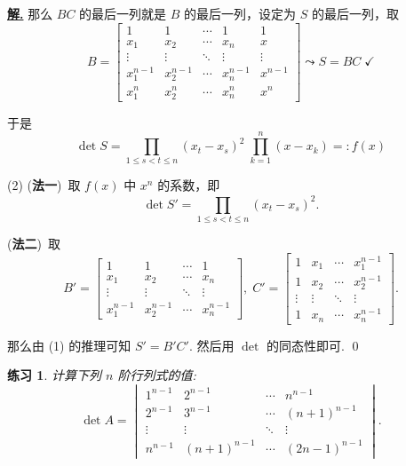 \documentclass[10pt,openany]{article}
\theoremstyle{thmstyle} %
\newtheorem{practice}{练习}[section]
\theoremstyle{defstyle} %
\theoremstyle{prostyle} %
\theoremstyle{exastyle}
\theoremstyle{remstyle}
\newenvironment{solution}{\par\underline{\textbf{解.}} \;\fangsong}{\qed\par}
\begin{document}
\begin{solution}
	那么 \( BC \) 的最后一列就是 \( B \) 的最后一列，设定为 \( S \) 的最后一列，取
	\[ B=\begin{bmatrix}
		1 & 1 & \cdots & 1 & 1 \\
		x_1 & x_2 & \cdots & x_n & x \\
		\vdots & \vdots & \ddots & \vdots & \vdots \\
		x_1^{n-1} & x_2^{n-1} & \cdots & x_n^{n-1} & x^{n-1} \\
		x_1^n & x_2^{n} & \cdots & x_n^{n} & x^n 
	\end{bmatrix} \leadsto S=BC \;  \checkmark \]
	
	于是 
	\[ \det S= \prod_{1 \leq s<t \leq n}^{} (x_t-x_s)^2 \; \prod_{k=1}^{n} (x-x_k)=:f(x) \]
	
	(2) (\textbf{法一})\ 取 \( f(x) \) 中 \( x^n \) 的系数，即
	\[ \det S'= \prod_{1 \leq s<t \leq n}^{} (x_t-x_s)^2. \]
	
	(\textbf{法二})\ 取
	\[ B'=\begin{bmatrix}
		1 & 1 & \cdots & 1  \\
		x_1 & x_2 & \cdots & x_n  \\
		\vdots & \vdots & \ddots & \vdots \\
		x_1^{n-1} & x_2^{n-1} & \cdots & x_n^{n-1} 
	\end{bmatrix}, \; C'=\begin{bmatrix}
	1 & x_1 & \cdots & x_1^{n-1} \\
	1 & x_2 & \cdots & x_2^{n-1} \\
	\vdots & \vdots & \ddots & \vdots  \\
	1 & x_n & \cdots & x_n^{n-1} 
	\end{bmatrix}. \]
	
	那么由 (1) 的推理可知 \( S'=B'C' \). 然后用 \( \det \) 的同态性即可.
\end{solution}


\begin{practice}
	计算下列 \( n \) 阶行列式的值:
	\[ \det A= \begin{vmatrix}
		1^{n-1} & 2^{n-1} & \cdots & n^{n-1} \\
		2^{n-1} & 3^{n-1} & \cdots & (n+1)^{n-1} \\
		\vdots & \vdots & \ddots & \vdots \\
		n^{n-1} & (n+1)^{n-1} & \cdots & (2n-1)^{n-1}
	\end{vmatrix}. \]
\end{practice}
\end{document}
